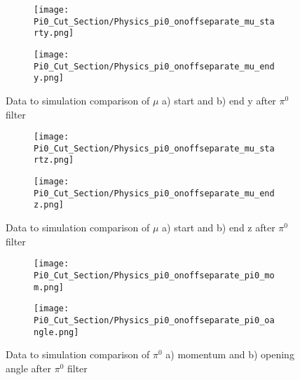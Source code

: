 \documentclass{article}
\begin{document}
\begin{figure}[t!]
\centering
  \begin{subfigure}[t]{0.3\textwidth}
    \centering
\texttt{[image: Pi0\_Cut\_Section/Physics\_pi0\_onoffseparate\_mu\_starty.png]}
  \caption{ }
  \end{subfigure} 
  \hspace{30mm}
  \begin{subfigure}[t]{0.3\textwidth}
    \centering
\texttt{[image: Pi0\_Cut\_Section/Physics\_pi0\_onoffseparate\_mu\_endy.png]}
  \caption{ }
  \end{subfigure} 
\caption{ Data to simulation comparison of $\mu$ a) start and b) end y after $\pi^0$ filter }
\label{fig:physics_pi0_mu_y}
\end{figure}

\begin{figure}[t!]
\centering
  \begin{subfigure}[t]{0.3\textwidth}
    \centering
\texttt{[image: Pi0\_Cut\_Section/Physics\_pi0\_onoffseparate\_mu\_startz.png]}
  \caption{ }
  \end{subfigure} 
  \hspace{30mm}
  \begin{subfigure}[t]{0.3\textwidth}
    \centering
\texttt{[image: Pi0\_Cut\_Section/Physics\_pi0\_onoffseparate\_mu\_endz.png]}
  \caption{ }
  \end{subfigure} 
\caption{ Data to simulation comparison of $\mu$ a) start and b) end z after $\pi^0$ filter }
\label{fig:physics_pi0_mu_z}
\end{figure}

\begin{figure}[h!]
\centering
  \begin{subfigure}[t]{0.3\textwidth}
    \centering
\texttt{[image: Pi0\_Cut\_Section/Physics\_pi0\_onoffseparate\_pi0\_mom.png]}
  \caption{ }
  \end{subfigure} 
  \hspace{30mm}
  \begin{subfigure}[t]{0.3\textwidth}
    \centering
\texttt{[image: Pi0\_Cut\_Section/Physics\_pi0\_onoffseparate\_pi0\_oangle.png]} 
  \caption{ }
  \end{subfigure} 

\label{fig:physics_pi0_pi0_oangle}
\caption{ Data to simulation comparison of $\pi^0$ a) momentum and b) opening angle after $\pi^0$ filter }
\end{figure}
\end{document}
